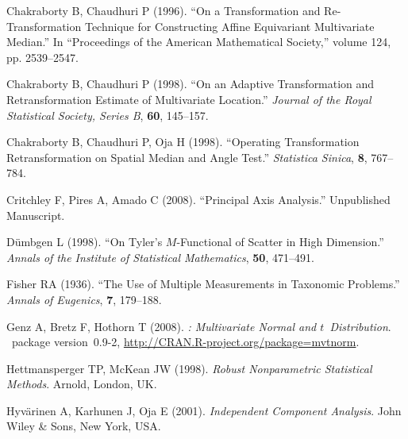\documentclass[article,nojss]{jss}
\begin{document}
\begin{thebibliography}{33}
Chakraborty B, Chaudhuri P (1996).
\newblock \enquote{On a Transformation and Re-Transformation Technique for
  Constructing Affine Equivariant Multivariate Median.}
\newblock In \enquote{Proceedings of the American Mathematical Society,} volume
  124, pp. 2539--2547.

Chakraborty B, Chaudhuri P (1998).
\newblock \enquote{On an Adaptive Transformation and Retransformation Estimate
  of Multivariate Location.}
\newblock \emph{Journal of the Royal Statistical Society, Series B},
  \textbf{60}, 145--157.

Chakraborty B, Chaudhuri P, Oja H (1998).
\newblock \enquote{Operating Transformation Retransformation on Spatial Median
  and Angle Test.}
\newblock \emph{Statistica Sinica}, \textbf{8}, 767--784.

Critchley F, Pires A, Amado C (2008).
\newblock \enquote{Principal Axis Analysis.}
\newblock Unpublished Manuscript.

D{\"u}mbgen L (1998).
\newblock \enquote{On {T}yler's {$M$}-Functional of Scatter in High Dimension.}
\newblock \emph{Annals of the Institute of Statistical Mathematics},
  \textbf{50}, 471--491.

Fisher RA (1936).
\newblock \enquote{The Use of Multiple Measurements in Taxonomic Problems.}
\newblock \emph{Annals of Eugenics}, \textbf{7}, 179--188.

Genz A, Bretz F, Hothorn T (2008).
\newblock \emph{: Multivariate Normal and $t$~Distribution}.
\newblock {}~package version~0.9-2,
  \urlprefix\url{http://CRAN.R-project.org/package=mvtnorm}.

Hettmansperger TP, McKean JW (1998).
\newblock \emph{Robust Nonparametric Statistical Methods}.
\newblock Arnold, London, UK.

Hyv{\"a}rinen A, Karhunen J, Oja E (2001).
\newblock \emph{Independent Component Analysis}.
\newblock John Wiley \& Sons, New York, USA.


\end{thebibliography}
\end{document}

